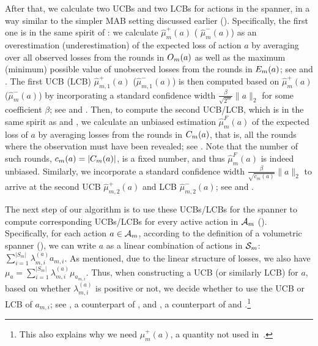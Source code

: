 After that, we calculate two UCBs and two LCBs for actions in the spanner, in a way similar to the simpler MAB setting discussed earlier ().
Specifically, 
the first one is in the same spirit of :
we calculate $\hat{\mu}_m^+(a)$ ( $\hat{\mu}_m^-(a)$) as an overestimation (underestimation) of the expected loss of action $a$ by averaging over all observed losses from the rounds in $O_m(a)$ as well as the maximum (minimum) possible value of unobserved losses from the rounds in $E_m(a)$; see  and .
The first UCB (LCB) $\hat{\mu}_{m,1}^+(a)$ ($\hat{\mu}_{m,1}^-(a)$) is then computed based on $\hat{\mu}_m^+(a)$ ($\hat{\mu}_m^-(a)$) by incorporating a standard confidence width $\frac{\beta}{\sqrt{2^m}}\|a\|_2$ for some coefficient $\beta$; see  and .
Then, to compute the second UCB/LCB, which is in the same spirit as  and , we calculate an unbiased estimation $\hat{\mu}_m^F(a)$ of the expected loss of $a$ by averaging losses from the rounds in $C_m(a)$, that is, all the rounds where the observation must have been revealed; see .
Note that the number of such rounds, $c_m(a) = |C_m(a)|$, is a fixed number, and thus $\hat{\mu}_m^F(a)$ is indeed unbiased.
Similarly, we incorporate a standard confidence width $\frac{\beta}{\sqrt{c_m(a)}}\|a\|_2$ to arrive at the second UCB $\hat{\mu}_{m,2}^+(a)$ and LCB $\hat{\mu}_{m,2}^-(a)$; see  and .

The next step of our algorithm is to use these UCBs/LCBs for the spanner to compute corresponding UCBs/LCBs for every active action in ${\mathcal{A}}_m$ (). Specifically, for each action $a\in {\mathcal{A}}_m$, according to the definition of a volumetric spanner (), we can write $a$ as a linear combination of actions in ${\mathcal{S}}_m$: $\sum_{i=1}^{|S_m|}\lambda_{m,i}^{(a)}a_{m,i}$. As mentioned, due to the linear structure of losses, we also have $\mu_a = \sum_{i=1}^{|S_m|}\lambda_{m,i}^{(a)}\mu_{a_{m,i}}$.
Thus, when constructing a UCB (or similarly LCB) for $a$, based on whether $\lambda_{m,i}^{(a)}$ is positive or not, we decide whether to use the UCB or LCB of $a_{m,i}$; see , a counterpart of , and , a counterpart of  and .\footnote{This also explains why we need $\hat{\mu}_m^+(a)$, a quantity not used in~\citet{schlisselberg2024delay}.}

